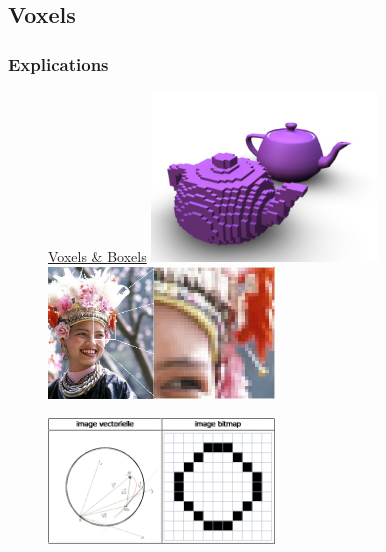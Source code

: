 \documentclass{beamer}
\begin{document}
\subsection{Voxels}
\subsubsection{Explications}
\begin{frame}
 \begin{center}
  \begin{figure}
   \Large \ul{Voxels \& Boxels}
   \includegraphics[width=6cm]{Images/Images_Alexis/voxel_teapot.jpg}
   \includegraphics[width=6cm]{Images/Images_Alexis/example_matricielle.jpg}
  \end{figure}
  \begin{figure}
   \includegraphics[width=6cm]{Images/Images_Alexis/comparaison_vecteur_matrice.png}
  \end{figure}
 \end{center}
\end{frame}
\end{document}
